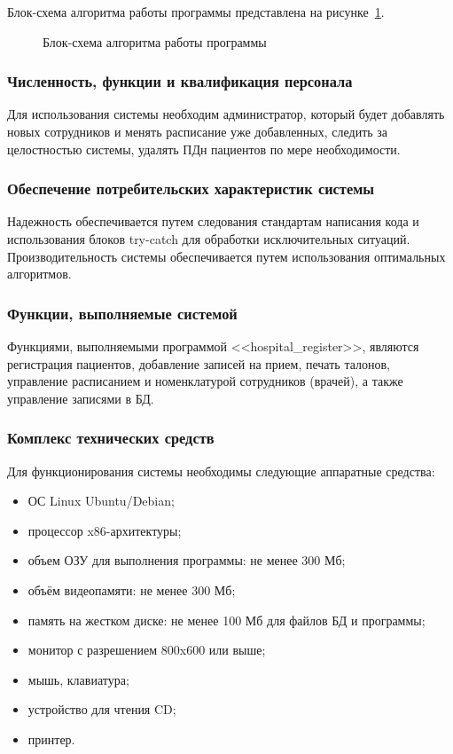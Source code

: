 Блок-схема алгоритма работы программы представлена на рисунке~\ref{block:block}.

\begin{figure}[h!]
\caption{Блок-схема алгоритма работы программы}
\label{block:block}
\end{figure}

\subsubsection{Численность, функции и квалификация персонала}

Для использования системы необходим администратор, который будет добавлять новых сотрудников и менять расписание уже добавленных, следить за целостностью системы, удалять ПДн пациентов по мере необходимости.

\subsubsection{Обеспечение потребительских характеристик системы}

Надежность обеспечивается путем следования стандартам написания кода и использования блоков try-catch для обработки исключительных ситуаций.
Производительность системы обеспечивается путем использования оптимальных алгоритмов.

\subsubsection{Функции, выполняемые системой}

Функциями, выполняемыми программой <<hospital\_register>>, являются регистрация пациентов, добавление записей на прием, печать талонов, управление расписанием и номенклатурой сотрудников (врачей), а также управление записями в БД. 

\subsubsection{Комплекс технических средств}

Для функционирования системы необходимы следующие аппаратные средства:

\begin{itemize}
  \item ОС Linux Ubuntu/Debian;
  \item процессор x86-архитектуры;
  \item объем ОЗУ для выполнения программы: не менее 300 Мб;
  \item объём видеопамяти: не менее 300 Мб;
  \item память на жестком диске: не менее 100 Мб для файлов БД и программы;
  \item монитор с разрешением 800x600 или выше;
  \item мышь, клавиатура;
  \item устройство для чтения CD;
  \item принтер.
\end{itemize}


